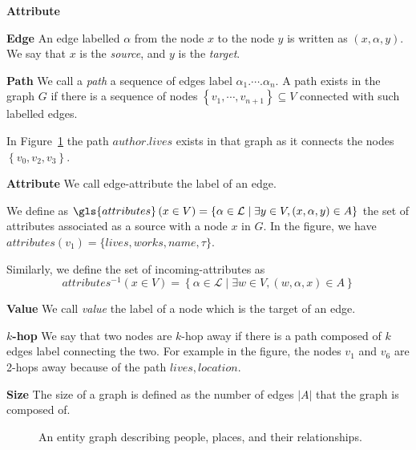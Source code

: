 \begin{labeling}{\textbf{Attribute}}
	\item[\textbf{Edge}] An edge labelled $\alpha$ from the node $x$ to the node $y$ is written as $\left(x, \alpha, y\right)$. We say that $x$ is the \emph{source}, and $y$ is the \emph{target}.

	\item[\textbf{Path}] We call a \emph{path} a sequence of edges label $\alpha_1.\cdots.\alpha_n$. A path exists in the graph $G$ if there is a sequence of nodes $\left\lbrace v_1, \cdots, v_{n+1} \right\rbrace \subseteq V$ connected with such labelled edges.

	In Figure~\ref{fig:graph} the path $author.lives$ exists in that graph as it connects the nodes $\left\lbrace v_0, v_2, v_3 \right\rbrace$.

	\item[\textbf{Attribute}] We call \gls{edge-attribute} the label of an edge.

		We define as $\gls{attributes}\left(x \in V\right) = \left\lbrace \alpha \in \mathcal{L} \mid \exists y \in V, (x, \alpha, y) \in A \right\rbrace$ the set of attributes associated as a source with a node $x$ in $G$. In the figure, we have $attributes(v_1) = \{lives,works,name,\tau\}$.

		Similarly, we define the set of \gls{incoming-attributes} as
	$$
	attributes^{-1}\left(x \in V\right) = \left\lbrace \alpha \in \mathcal{L} \mid \exists w \in V, (w, \alpha, x) \in A \right\rbrace
	$$
	\item[\textbf{Value}] We call \emph{value} the label of a node which is the target of an edge.

	\item[\textbf{$k$-hop}] We say that two nodes are $k$-hop away if there is a path composed of $k$ edges label connecting the two. For example in the figure, the nodes $v_1$ and $v_6$ are 2-hops away because of the path $lives, location$.

	\item[\textbf{Size}] The size of a graph is defined as the number of edges $\vert A \vert$ that the graph is composed of.
\end{labeling}

\begin{figure}
	\centering
	\resizebox{\textwidth}{!}{
		
	}
	\caption{An entity graph describing people, places, and their relationships.}
	\label{fig:graph}
\end{figure}

